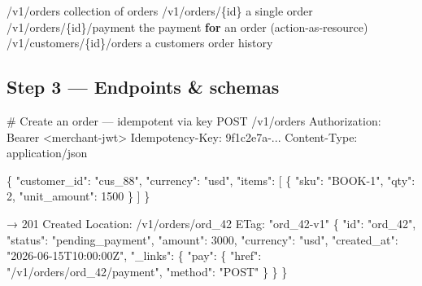 \documentclass[11pt]{article}
\newenvironment{Shaded}{\begin{snugshade}}{\end{snugshade}}
\newcommand{\BuiltInTok}[1]{\textcolor[rgb]{0.50,0.55,0.55}{#1}}
\newcommand{\ControlFlowTok}[1]{\textcolor[rgb]{0.99,0.74,0.29}{\textbf{#1}}}
\newcommand{\ImportTok}[1]{\textcolor[rgb]{0.15,0.68,0.38}{#1}}
\newcommand{\NormalTok}[1]{\textcolor[rgb]{0.81,0.81,0.76}{#1}}
\newcommand{\OperatorTok}[1]{\textcolor[rgb]{0.81,0.81,0.76}{#1}}
\newcommand{\StringTok}[1]{\textcolor[rgb]{0.96,0.31,0.31}{#1}}
\begin{document}
\begin{Shaded}
\begin{Highlighting}[]
\OperatorTok{/}\NormalTok{v1}\OperatorTok{/}\NormalTok{orders                    collection of orders}
\OperatorTok{/}\NormalTok{v1}\OperatorTok{/}\NormalTok{orders}\OperatorTok{/}\NormalTok{\{}\BuiltInTok{id}\NormalTok{\}               a single order}
\OperatorTok{/}\NormalTok{v1}\OperatorTok{/}\NormalTok{orders}\OperatorTok{/}\NormalTok{\{}\BuiltInTok{id}\NormalTok{\}}\OperatorTok{/}\NormalTok{payment       the payment }\ControlFlowTok{for}\NormalTok{ an order (action}\OperatorTok{{-}}\ImportTok{as}\OperatorTok{{-}}\NormalTok{resource)}
\OperatorTok{/}\NormalTok{v1}\OperatorTok{/}\NormalTok{customers}\OperatorTok{/}\NormalTok{\{}\BuiltInTok{id}\NormalTok{\}}\OperatorTok{/}\NormalTok{orders     a customer}\StringTok{\textquotesingle{}s order history}
\end{Highlighting}
\end{Shaded}

\subsection{Step 3 --- Endpoints \& schemas}\label{step-3--endpoints--schemas}


\begin{Shaded}
\begin{Highlighting}[]
\NormalTok{\# Create an order — idempotent via key}
\NormalTok{POST /v1/orders}
\NormalTok{Authorization: Bearer \textless{}merchant{-}jwt\textgreater{}}
\NormalTok{Idempotency{-}Key: 9f1c2e7a{-}...}
\NormalTok{Content{-}Type: application/json}

\NormalTok{\{ "customer\_id": "cus\_88", "currency": "usd",}
\NormalTok{  "items": [ \{ "sku": "BOOK{-}1", "qty": 2, "unit\_amount": 1500 \} ] \}}

\NormalTok{→ 201 Created}
\NormalTok{  Location: /v1/orders/ord\_42}
\NormalTok{  ETag: "ord\_42{-}v1"}
\NormalTok{\{ "id": "ord\_42", "status": "pending\_payment", "amount": 3000,}
\NormalTok{  "currency": "usd", "created\_at": "2026{-}06{-}15T10:00:00Z",}
\NormalTok{  "\_links": \{ "pay": \{ "href": "/v1/orders/ord\_42/payment", "method": "POST" \} \} \}}
\end{Highlighting}
\end{Shaded}

\end{document}
